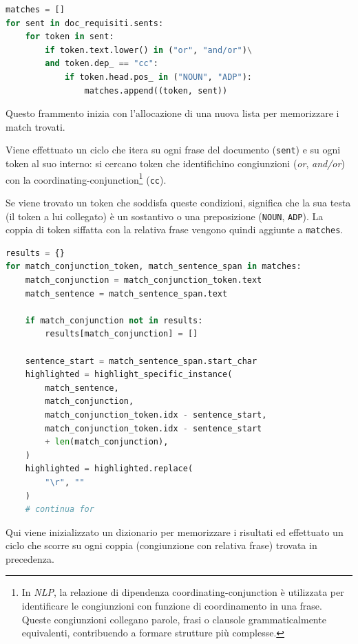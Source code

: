 \documentclass[12pt]{report}
\newcommand{\nlp}{\textsl{NLP}\xspace}
\begin{document}
\begin{mdframed}
\small
\begin{lstlisting}[language=Python]
matches = []
for sent in doc_requisiti.sents:
    for token in sent:
        if token.text.lower() in ("or", "and/or")\
        and token.dep_ == "cc":
            if token.head.pos_ in ("NOUN", "ADP"):
                matches.append((token, sent))
\end{lstlisting}
\end{mdframed}

\noindent Questo frammento inizia con l'allocazione di una nuova lista per memorizzare i match trovati.

Viene effettuato un ciclo che itera su ogni frase del documento (\texttt{sent}) e su ogni token al suo interno: si cercano token che identifichino congiunzioni (\textit{or}, \textit{and/or}) con la coordinating-conjunction\footnote{In \nlp , la relazione di dipendenza coordinating-conjunction è utilizzata per identificare le congiunzioni con funzione di coordinamento in una frase. Queste congiunzioni collegano parole, frasi o clausole grammaticalmente equivalenti, contribuendo a formare strutture più complesse.} (\texttt{cc}).

Se viene trovato un token che soddisfa queste condizioni, significa che la sua testa (il token a lui collegato) è un sostantivo o una preposizione (\texttt{NOUN}, \texttt{ADP}). La coppia di token siffatta con la relativa frase vengono quindi aggiunte a \texttt{matches}.


\begin{mdframed}
\small
\begin{lstlisting}[language=Python]
results = {}
for match_conjunction_token, match_sentence_span in matches:
    match_conjunction = match_conjunction_token.text
    match_sentence = match_sentence_span.text

    if match_conjunction not in results:
        results[match_conjunction] = []

    sentence_start = match_sentence_span.start_char
    highlighted = highlight_specific_instance(
        match_sentence,
        match_conjunction,
        match_conjunction_token.idx - sentence_start,
        match_conjunction_token.idx - sentence_start
        + len(match_conjunction),
    )
    highlighted = highlighted.replace(
        "\r", ""
    )
    # continua for
\end{lstlisting}
\end{mdframed}

\noindent Qui viene inizializzato un dizionario per memorizzare i risultati ed effettuato un ciclo che scorre su ogni coppia (congiunzione con relativa frase) trovata in precedenza.
\end{document}
